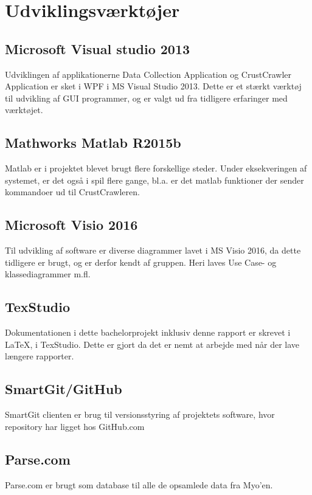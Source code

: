 \section{Udviklingsværktøjer}
\label{sec:Udviklingsvaerktojer}

\subsection*{Microsoft Visual studio 2013}
Udviklingen af applikationerne Data Collection Application og CrustCrawler Application er sket i WPF i MS Visual Studio 2013. Dette er et stærkt værktøj til udvikling af GUI programmer, og er valgt ud fra tidligere erfaringer med værktøjet.

\subsection*{Mathworks Matlab R2015b}
Matlab er i projektet blevet brugt flere forskellige steder. Under eksekveringen af systemet, er det også i spil flere gange, bl.a. er det matlab funktioner der sender kommandoer ud til CrustCrawleren.

\subsection*{Microsoft Visio 2016}

Til udvikling af software er diverse diagrammer lavet i MS Visio 2016, da dette tidligere er brugt, og er derfor kendt af gruppen. Heri laves Use Case- og klassediagrammer m.fl.

\subsection*{TexStudio}
Dokumentationen i dette bachelorprojekt inklusiv denne rapport er skrevet i \LaTeX, i TexStudio. Dette er gjort da det er nemt at arbejde med når der lave længere rapporter.

\subsection*{SmartGit/GitHub}
SmartGit clienten er brug til versionsstyring af projektets software, hvor repository har ligget hos GitHub.com

\subsection*{Parse.com}
Parse.com \cite{parse} er brugt som database til alle de opsamlede data fra Myo'en.

